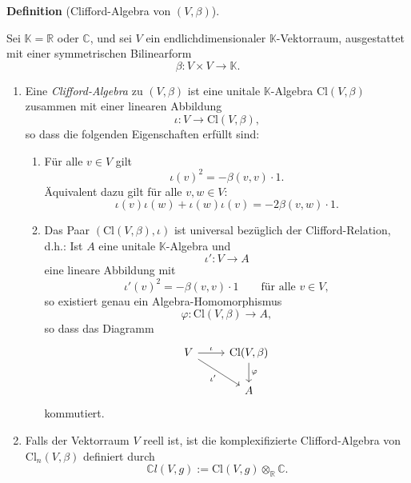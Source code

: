 \documentclass[10pt, letterpaper]{article}
\newcommand{\R}{\mathbb{R}}
\newcommand{\C}{\mathbb{C}}
\newcommand{\Cl}{\mathrm{Cl}}
\newcommand{\CustomHeading}[3]{%
  \par\medskip\noindent%
  \textbf{#1 #2} \textnormal{(#3)}.\enskip%
}
\newenvironment{DEF}[2]{\CustomHeading{Definition}{#1}{#2}}{}
\begin{document}
\begin{DEF}{}{Clifford-Algebra von \((V,\beta)\)}
Sei \(\mathbb{K}=\mathbb{R}\) oder \(\mathbb{C}\), und sei \(V\) ein endlichdimensionaler \(\mathbb{K}\)-Vektorraum, ausgestattet mit einer symmetrischen Bilinearform
\[
\beta:V\times V\to \mathbb{K}.
\]

\begin{enumerate}
\item Eine \emph{Clifford-Algebra} zu \((V,\beta)\) ist eine unitale \(\mathbb{K}\)-Algebra
\(\Cl(V,\beta)\) zusammen mit einer linearen Abbildung
\[
\iota:V\to \Cl(V,\beta),
\]
so dass die folgenden Eigenschaften erfüllt sind:

\begin{enumerate}
    \item Für alle \(v\in V\) gilt
    \[
    \iota(v)^2=-\beta(v,v)\cdot 1.
    \]
    Äquivalent dazu gilt für alle \(v,w\in V\):
    \[
    \iota(v)\iota(w)+\iota(w)\iota(v)=-2\beta(v,w)\cdot 1.
    \]

    \item Das Paar \((\Cl(V,\beta),\iota)\) ist universal bezüglich der Clifford-Relation, d.h.:
    Ist \(A\) eine unitale \(\mathbb{K}\)-Algebra und
    \[
    \iota':V\to A
    \]
    eine lineare Abbildung mit
    \[
    \iota'(v)^2=-\beta(v,v)\cdot 1
    \qquad\text{für alle }v\in V,
    \]
    so existiert genau ein Algebra-Homomorphismus
    \[
    \varphi:\Cl(V,\beta)\to A,
    \]
    so dass das Diagramm
    \[
    \begin{tikzcd}
    V \arrow[r, "\iota"] \arrow[dr, "\iota'"'] & \Cl(V,\beta) \arrow[d, "\varphi"] \\
    & A
    \end{tikzcd}
    \]
    kommutiert.
\end{enumerate}

\item Falls der Vektorraum $V$ reell ist, ist die komplexifizierte Clifford-Algebra von $\Cl_n(V,\beta)$ definiert durch 
  \[
  \C l(V,g):=\Cl(V,g)\otimes_{\R}\C.
  \]
\end{enumerate}
\end{DEF}
\end{document}
